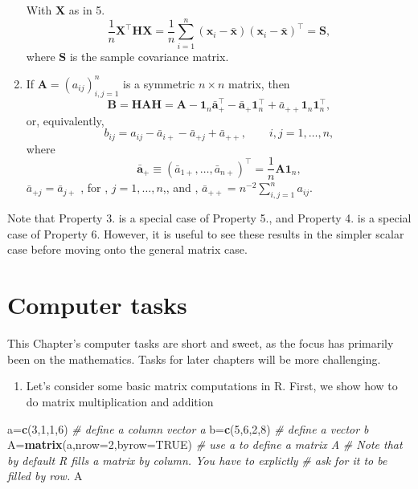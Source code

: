 \documentclass[
]{book}
\newenvironment{Shaded}{\begin{snugshade}}{\end{snugshade}}
\newcommand{\AttributeTok}[1]{\textcolor[rgb]{0.13,0.29,0.53}{#1}}
\newcommand{\CommentTok}[1]{\textcolor[rgb]{0.56,0.35,0.01}{\textit{#1}}}
\newcommand{\ConstantTok}[1]{\textcolor[rgb]{0.56,0.35,0.01}{#1}}
\newcommand{\DecValTok}[1]{\textcolor[rgb]{0.00,0.00,0.81}{#1}}
\newcommand{\FunctionTok}[1]{\textcolor[rgb]{0.13,0.29,0.53}{\textbf{#1}}}
\newcommand{\NormalTok}[1]{#1}
\newcommand{\OtherTok}[1]{\textcolor[rgb]{0.56,0.35,0.01}{#1}}
\providecommand{\tightlist}{%
  \setlength{\itemsep}{0pt}\setlength{\parskip}{0pt}}
\theoremstyle{definition}
\theoremstyle{definition}
\theoremstyle{definition}
\theoremstyle{definition}
\theoremstyle{remark}
\begin{document}
\begin{enumerate}
  With \(\mathbf X\) as in 5.
  \[
  \frac{1}{n}\mathbf X^\top \mathbf H\mathbf X=\frac{1}{n} \sum_{i=1}^n (\mathbf x_i -\bar{\mathbf x})(\mathbf x_i -\bar{\mathbf x})^\top =\mathbf S,
  \]
  where \(\mathbf S\) is the sample covariance matrix.
\item
  If \(\mathbf A=(a_{ij})_{i,j=1}^n\) is a symmetric \(n \times n\) matrix, then
  \[
  \mathbf B=\mathbf H\mathbf A\mathbf H= \mathbf A- {\mathbf 1}_n \bar{\mathbf a}_+^\top -\bar{\mathbf a}_+{\mathbf 1}_n^\top +\bar{a}_{++}{\mathbf 1}_n {\mathbf 1}_n^\top,
  \]
  or, equivalently,
  \[
  b_{ij}=a_{ij}-\bar{a}_{i+}-\bar{a}_{+j}+\bar{a}_{++}, \qquad i,j=1, \ldots , n,
  \]
  where
  \[
  \bar{\mathbf a}_{+}\equiv (\bar{a}_{1+}, \ldots , \bar{a}_{n+})^\top=\frac{1}{n}\mathbf A{\mathbf 1}_n,
  \]
  \(\bar{a}_{+j}=\bar{a}_{j+}\) , for , \(j=1, \ldots , n\),, and , \(\bar{a}_{++}=n^{-2}\sum_{i,j=1}^n a_{ij}\).
\end{enumerate}

Note that Property 3. is a special case of Property 5., and Property 4. is a special case of Property 6.
However, it is useful to see these results in the simpler scalar case before moving onto the general matrix case.

\hypertarget{tasks-ch2}{%
\section{Computer tasks}\label{tasks-ch2}}

This Chapter's computer tasks are short and sweet, as the focus has primarily been on the mathematics. Tasks for later chapters will be more challenging.

\begin{enumerate}
\def\labelenumi{\arabic{enumi}.}
\setcounter{enumi}{-1}
\tightlist
\item
  Let's consider some basic matrix computations in R. First, we show how to do matrix multiplication and addition
\end{enumerate}

\begin{Shaded}
\begin{Highlighting}[]
\NormalTok{a}\OtherTok{=}\FunctionTok{c}\NormalTok{(}\DecValTok{3}\NormalTok{,}\DecValTok{1}\NormalTok{,}\DecValTok{1}\NormalTok{,}\DecValTok{6}\NormalTok{)                     }\CommentTok{\# define a column  vector a}
\NormalTok{b}\OtherTok{=}\FunctionTok{c}\NormalTok{(}\DecValTok{5}\NormalTok{,}\DecValTok{6}\NormalTok{,}\DecValTok{2}\NormalTok{,}\DecValTok{8}\NormalTok{)                     }\CommentTok{\# define a  vector b}
\NormalTok{A}\OtherTok{=}\FunctionTok{matrix}\NormalTok{(a,}\AttributeTok{nrow=}\DecValTok{2}\NormalTok{,}\AttributeTok{byrow=}\ConstantTok{TRUE}\NormalTok{)    }\CommentTok{\# use a to define a matrix A}
\CommentTok{\# Note that by default R fills a matrix by column. You have to explictly}
\CommentTok{\# ask for it to be filled by row.}
\NormalTok{A}
\end{Highlighting}
\end{Shaded}
\end{document}
